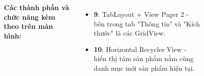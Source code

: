 \documentclass{beamer}
\begin{document}
\begin{frame}
\begin{columns}
\begin{figure}
        \end{figure}
        \indent \textbf{Các thành phần và chức năng kèm theo trên màn hình:}
        \begin{itemize}
            \item \textbf{9}: TabLayout + View Pager 2 - bên trong tab "Thông tin" và "Kích thước" là các GridView.
            \item \textbf{10}: Horizontal Recycler View - hiển thị tám sản phẩm nằm cùng danh mục mới sản phẩm hiện tại.

        \end{itemize}
    \end{columns}
\end{frame}

\end{document}
